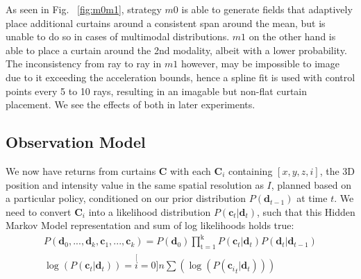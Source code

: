 \documentclass[review]{cvpr}
\begin{document}
As seen in Fig. ~\ref{fig:m0m1}, strategy $m0$ is able to generate fields that adaptively place additional curtains around a consistent span around the mean, but is unable to do so in cases of multimodal distributions. $m1$ on the other hand is able to place a curtain around the 2nd modality, albeit with a lower probability. The inconsistency from ray to ray in $m1$ however, may be impossible to image due to it exceeding the acceleration bounds, hence a spline fit is used with control points every 5 to 10 rays, resulting in an imagable but non-flat curtain placement. We see the effects of both in later experiments.

\subsection{Observation Model}

We now have returns from curtains $\mathbf{C}$ with each $\mathbf{C}_{i}$ containing $[x,y,z,i]$, the 3D position and intensity value in the same spatial resolution as $I$, planned based on a particular policy, conditioned on our prior distribution $P(\mathbf{d}_{t-1})$ at time $t$. We need to convert $\mathbf{C}_{i}$ into a likelihood distribution $P(\mathbf{c}_{t}|\mathbf{d}_{t})$, such that this Hidden Markov Model representation and sum of log likelihoods holds true:
\small
\begin{align}
   P\left(\mathbf{d}_{0},...,\mathbf{d}_{k},\mathbf{c}_{1},...,\mathbf{c}_{k}\right)= 
   P\left(\mathbf{d}_{0}\right)\mathbf{\mathbf{\prod}_{\mathrm{t=1}}^{\mathrm{k}}}P\left(\mathbf{c}_{t}|\mathbf{d}_{t}\right)P\left(\mathbf{d}_{t}|\mathbf{d}_{t-1}\right) \nonumber\\
   \log\left(P\left(\mathbf{c}_{t}|\mathbf{d}_{t}\right)\right)=\stackrel[i=0]{n}{\sum}\left(\log\left(P\left(\mathbf{c_{\mathit{i}}}_{t}|\mathbf{d}_{t}\right)\right)\right)
   \label{eq:hmm}
\end{align}
\normalsize



\end{document}
